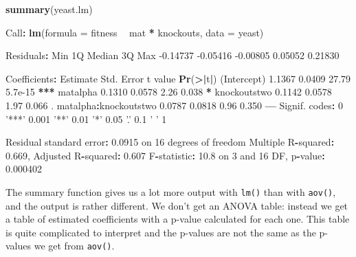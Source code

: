 \documentclass[
]{book}
\newenvironment{Shaded}{\begin{snugshade}}{\end{snugshade}}
\newcommand{\DataTypeTok}[1]{\textcolor[rgb]{0.13,0.29,0.53}{#1}}
\newcommand{\DecValTok}[1]{\textcolor[rgb]{0.00,0.00,0.81}{#1}}
\newcommand{\ErrorTok}[1]{\textcolor[rgb]{0.64,0.00,0.00}{\textbf{#1}}}
\newcommand{\FloatTok}[1]{\textcolor[rgb]{0.00,0.00,0.81}{#1}}
\newcommand{\KeywordTok}[1]{\textcolor[rgb]{0.13,0.29,0.53}{\textbf{#1}}}
\newcommand{\NormalTok}[1]{#1}
\newcommand{\OperatorTok}[1]{\textcolor[rgb]{0.81,0.36,0.00}{\textbf{#1}}}
\newcommand{\StringTok}[1]{\textcolor[rgb]{0.31,0.60,0.02}{#1}}
\begin{document}
\begin{Shaded}
\begin{Highlighting}[]
\KeywordTok{summary}\NormalTok{(yeast.lm)}

\NormalTok{Call}\OperatorTok{:}
\KeywordTok{lm}\NormalTok{(}\DataTypeTok{formula =}\NormalTok{ fitness }\OperatorTok{~}\StringTok{ }\NormalTok{mat }\OperatorTok{*}\StringTok{ }\NormalTok{knockouts, }\DataTypeTok{data =}\NormalTok{ yeast)}

\NormalTok{Residuals}\OperatorTok{:}
\StringTok{     }\NormalTok{Min       1Q   Median       3Q      Max }
\FloatTok{-0.14737} \FloatTok{-0.05416} \FloatTok{-0.00805}  \FloatTok{0.05052}  \FloatTok{0.21830} 

\NormalTok{Coefficients}\OperatorTok{:}
\StringTok{                      }\NormalTok{Estimate Std. Error t value }\KeywordTok{Pr}\NormalTok{(}\OperatorTok{>}\ErrorTok{|}\NormalTok{t}\OperatorTok{|}\NormalTok{)    }
\NormalTok{(Intercept)             }\FloatTok{1.1367}     \FloatTok{0.0409}   \FloatTok{27.79}  \FloatTok{5.7e-15} \OperatorTok{**}\ErrorTok{*}
\NormalTok{matalpha                }\FloatTok{0.1310}     \FloatTok{0.0578}    \FloatTok{2.26}    \FloatTok{0.038} \OperatorTok{*}\StringTok{  }
\NormalTok{knockoutstwo            }\FloatTok{0.1142}     \FloatTok{0.0578}    \FloatTok{1.97}    \FloatTok{0.066}\NormalTok{ .  }
\NormalTok{matalpha}\OperatorTok{:}\NormalTok{knockoutstwo   }\FloatTok{0.0787}     \FloatTok{0.0818}    \FloatTok{0.96}    \FloatTok{0.350}    
\OperatorTok{---}
\NormalTok{Signif. codes}\OperatorTok{:}\StringTok{  }\DecValTok{0} \StringTok{'***'} \FloatTok{0.001} \StringTok{'**'} \FloatTok{0.01} \StringTok{'*'} \FloatTok{0.05} \StringTok{'.'} \FloatTok{0.1} \StringTok{' '} \DecValTok{1}

\NormalTok{Residual standard error}\OperatorTok{:}\StringTok{ }\FloatTok{0.0915}\NormalTok{ on }\DecValTok{16}\NormalTok{ degrees of freedom}
\NormalTok{Multiple R}\OperatorTok{-}\NormalTok{squared}\OperatorTok{:}\StringTok{  }\FloatTok{0.669}\NormalTok{, Adjusted R}\OperatorTok{-}\NormalTok{squared}\OperatorTok{:}\StringTok{  }\FloatTok{0.607} 
\NormalTok{F}\OperatorTok{-}\NormalTok{statistic}\OperatorTok{:}\StringTok{ }\FloatTok{10.8}\NormalTok{ on }\DecValTok{3}\NormalTok{ and }\DecValTok{16}\NormalTok{ DF,  p}\OperatorTok{-}\NormalTok{value}\OperatorTok{:}\StringTok{ }\FloatTok{0.000402}
\end{Highlighting}
\end{Shaded}

The summary function gives us a lot more output with \texttt{lm()} than with \texttt{aov()}, and the output is rather different. We don't get an ANOVA table: instead we get a table of estimated coefficients with a p-value calculated for each one. This table is quite complicated to interpret and the p-values are not the same as the p-values we get from \texttt{aov()}.
\end{document}
